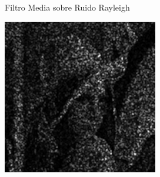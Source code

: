 \documentclass{beamer}
\begin{document}
\begin{frame}[fragile]{Filtro Media sobre Ruido Rayleigh}
\begin{minipage}{0.25\linewidth}
	\end{minipage}\hfill
	\begin{minipage}{0.25\linewidth}
		\centering
		\includegraphics[width=\linewidth]{../results/lena_rayleigh_xi10_media}
	\end{minipage}
\end{frame}
\end{document}

